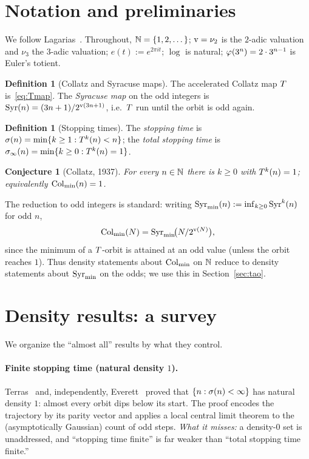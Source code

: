 \documentclass[11pt]{amsart}
\newtheorem{conjecture}[theorem]{Conjecture}
\theoremstyle{definition}
\newtheorem{definition}[theorem]{Definition}
\theoremstyle{remark}
\begin{document}
\section{Notation and preliminaries}
\label{sec:notation}

We follow Lagarias~\citep{lagarias1985,lagarias2010}. Throughout, $\mathbb{N}=\{1,2,\dots\}$;
$\operatorname{v}=\nu_2$ is the $2$-adic valuation and $\nu_3$ the $3$-adic valuation; $e(t):=e^{2\pi i t}$;
$\log$ is natural; $\varphi(3^n)=2\cdot3^{n-1}$ is Euler's totient.

\begin{definition}[Collatz and Syracuse maps]
The accelerated Collatz map $T$ is~\eqref{eq:Tmap}. The \emph{Syracuse map} on the odd integers is
$\mathrm{Syr}(n) = (3n+1)/2^{\operatorname{v}(3n+1)}$, i.e.\ $T$ run until the orbit is odd again.
\end{definition}

\begin{definition}[Stopping times]
The \emph{stopping time} is $\sigma(n)=\min\{k\ge1:T^k(n)<n\}$; the \emph{total stopping time}
is $\sigma_\infty(n)=\min\{k\ge0:T^k(n)=1\}$.
\end{definition}

\begin{conjecture}[Collatz, 1937]\label{conj:collatz}
For every $n\in\mathbb{N}$ there is $k\ge0$ with $T^k(n)=1$; equivalently $\mathrm{Col}_{\min}(n)=1$.
\end{conjecture}

The reduction to odd integers is standard: writing $\mathrm{Syr}_{\min}(n):=\inf_{k\ge0}\mathrm{Syr}^k(n)$ for odd $n$,
\begin{equation}
   \mathrm{Col}_{\min}(N) = \mathrm{Syr}_{\min}\!\big(N/2^{\operatorname{v}(N)}\big),
   \label{eq:colsyr}
\end{equation}
since the minimum of a $T$-orbit is attained at an odd value (unless the orbit reaches $1$).
Thus density statements about $\mathrm{Col}_{\min}$ on $\mathbb{N}$ reduce to density statements about $\mathrm{Syr}_{\min}$ on
the odds; we use this in Section~\ref{sec:tao}.

\section{Density results: a survey}
\label{sec:history}

We organize the ``almost all'' results by what they control.

\paragraph{Finite stopping time (natural density $1$).}
Terras~\citep{terras1976} and, independently, Everett~\citep{everett1977} proved that
$\{n:\sigma(n)<\infty\}$ has natural density $1$: almost every orbit dips below its start.
The proof encodes the trajectory by its parity vector and applies a local central limit theorem to
the (asymptotically Gaussian) count of odd steps. \emph{What it misses:} a density-$0$ set is
unaddressed, and ``stopping time finite'' is far weaker than ``total stopping time finite.''
\end{document}
